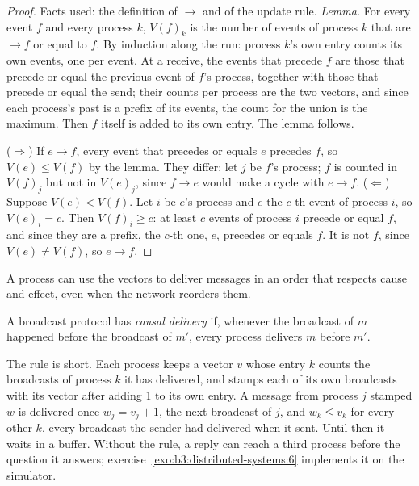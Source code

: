 \begin{proof}
Facts used: the definition of $\to$ and of the update rule. \emph{Lemma.} For every event $f$ and every process $k$, $V(f)_k$ is the number of events of process $k$ that are $\to f$ or equal to $f$. By induction along the run: process $k$'s own entry counts its own events, one per event. At a receive, the events that precede $f$ are those that precede or equal the previous event of $f$'s process, together with those that precede or equal the send; their counts per process are the two vectors, and since each process's past is a prefix of its events, the count for the union is the maximum. Then $f$ itself is added to its own entry. The lemma follows.

($\Rightarrow$) If $e \to f$, every event that precedes or equals $e$ precedes $f$, so $V(e) \le V(f)$ by the lemma. They differ: let $j$ be $f$'s process; $f$ is counted in $V(f)_j$ but not in $V(e)_j$, since $f \to e$ would make a cycle with $e \to f$. ($\Leftarrow$) Suppose $V(e) < V(f)$. Let $i$ be $e$'s process and $e$ the $c$-th event of process $i$, so $V(e)_i = c$. Then $V(f)_i \ge c$: at least $c$ events of process $i$ precede or equal $f$, and since they are a prefix, the $c$-th one, $e$, precedes or equals $f$. It is not $f$, since $V(e) \ne V(f)$, so $e \to f$.
\end{proof}

A process can use the vectors to deliver messages in an order that respects cause and effect, even when the network reorders them.

\begin{definition}\label{def:b3:distributed-systems:causal}
A broadcast protocol has \emph{causal delivery} if, whenever the broadcast of $m$ happened before the broadcast of $m'$, every process delivers $m$ before $m'$.
\end{definition}

The rule is short. Each process keeps a vector $v$ whose entry $k$ counts the broadcasts of process $k$ it has delivered, and stamps each of its own broadcasts with its vector after adding 1 to its own entry. A message from process $j$ stamped $w$ is delivered once $w_j = v_j + 1$, the next broadcast of $j$, and $w_k \le v_k$ for every other $k$, every broadcast the sender had delivered when it sent. Until then it waits in a buffer. Without the rule, a reply can reach a third process before the question it answers; exercise~\ref{exo:b3:distributed-systems:6} implements it on the simulator.

